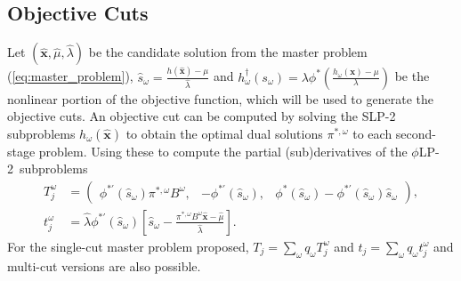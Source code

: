 \documentclass[opre,nonblindrev]{informs3} %
\newcommand{\x}{\mathbf{x}}
\newcommand{\xh}{\hat{\x}}
\newcommand{\lh}{\hat{\lambda}}
\newcommand{\mh}{\hat{\mu}}
\newcommand{\plp}{$\phi$LP-2}
\begin{document}
\subsection{Objective Cuts}

Let $(\xh,\mh, \lh)$ be the candidate solution from the master problem (\ref{eq:master_problem}), $\hat{s}_\omega = \frac{h(\xh)-\mu}{\lh}$ and $h^\dagger_\omega(s_\omega) = \lambda \phi^*\left(\frac{h_\omega(\x) - \mu}{\lambda}\right)$ be the nonlinear portion of the objective function, which will be used to generate the objective cuts.
An objective cut can be computed by solving the SLP-2 subproblems $h_\omega(\xh)$ to obtain the optimal dual solutions $\pi^{*,\omega}$ to each second-stage problem. Using these to compute the partial (sub)derivatives of the \plp\ subproblems
\begin{align*}
	T_j^\omega & = 
	\left( \begin{array}{ccc}
		\phi^{*\prime}(\hat{s}_\omega) \pi^{*,\omega}B^\omega, 
			 & -\phi^{*\prime}(\hat{s}_\omega), 
			 & \phi^*(\hat{s}_\omega) - \phi^{*\prime}(\hat{s}_\omega) \hat{s}_\omega
	\end{array} \right), \\
	t_j^\omega & = \lh \phi^{*\prime}(\hat{s}_\omega)\left[\hat{s}_\omega - \frac{\pi^{*,\omega}B^\omega\xh - \mh}{\lh}\right].
\end{align*}
For the single-cut master problem proposed, $T_j = \sum_\omega q_\omega T_j^\omega$ and $t_j = \sum_\omega q_\omega t_j^\omega$ and multi-cut versions are also possible. 
\end{document}
